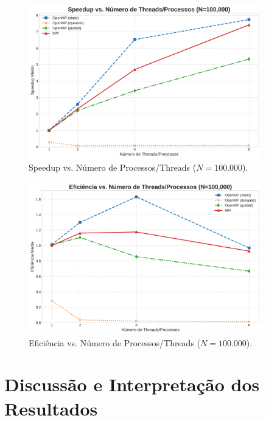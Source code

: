 \documentclass[12pt, a4paper]{article}
\begin{document}
\begin{figure}[H]
    \centering
    \includegraphics[width=0.9\textwidth]{../graficos/speedup_vs_processos_100000.png}
    \caption{Speedup vs. Número de Processos/Threads ($N=100.000$).}
    \label{fig:speedup}
\end{figure}

\begin{figure}[H]
    \centering
    \includegraphics[width=0.9\textwidth]{../graficos/eficiencia_vs_processos_100000.png}
    \caption{Eficiência vs. Número de Processos/Threads ($N=100.000$).}
    \label{fig:eficiencia}
\end{figure}

\section{Discussão e Interpretação dos Resultados}
\end{document}
